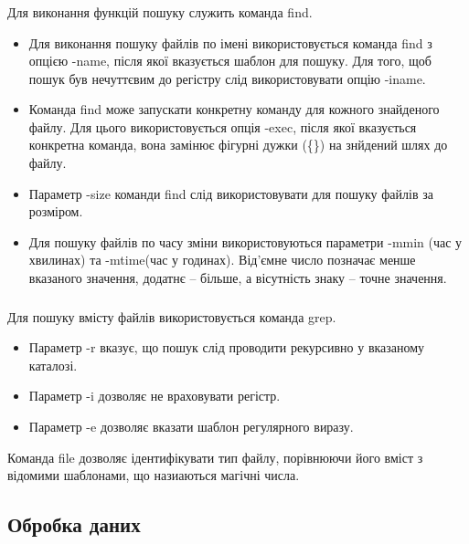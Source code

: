 \documentclass[t]{beamer}  %
\begin{document}
\begin{frame}
  \frametitle{\insertsection} 
	\framesubtitle{\insertsubsection}
Для виконання функцій пошуку служить команда find.	
\begin{itemize}
\item Для виконання пошуку файлів по імені використовується команда find з опцією -name, після якої вказується шаблон для пошуку. Для того, щоб пошук був нечуттєвим до регістру слід використовувати опцію -iname.
\item Команда find може запускати конкретну команду для кожного знайденого файлу. Для цього використовується опція -exec, після якої вказується конкретна команда, вона замінює фігурні дужки (\{\}) на знйдений шлях до файлу.
\item Параметр -size команди find слід використовувати для пошуку файлів за розміром.
\item Для пошуку файлів по часу зміни використовуються параметри -mmin (час у хвилинах) та -mtime(час у годинах). Від'ємне число позначає менше вказаного значення, додатнє -- більше, а вісутність знаку -- точне значення. 
\end{itemize}
\end{frame}

\begin{frame}
  \frametitle{\insertsection} 
	\framesubtitle{\insertsubsection}
Для пошуку вмісту файлів використовується команда grep.
\begin{itemize}
  \item Параметр -r вказує, що пошук слід проводити рекурсивно у вказаному каталозі.
  \item Параметр -i дозволяє не враховувати регістр.
  \item Параметр -e дозволяє вказати шаблон регулярного виразу.
\end{itemize}
Команда file дозволяє ідентифікувати тип файлу, порівнюючи його вміст з відомими шаблонами, що назиаються магічні числа. 

\end{frame}		
	
\subsection{Обробка даних}
 
\end{document}
